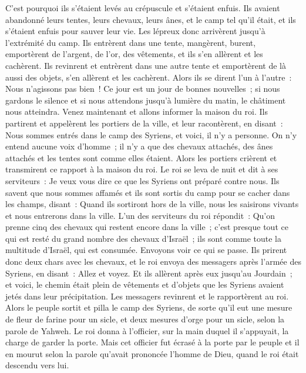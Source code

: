 \begin{multicols}{2}
C'est pourquoi ils s'étaient levés au crépuscule et s'étaient enfuis. Ils avaient abandonné leurs tentes, leurs chevaux, leurs ânes, et le camp tel qu'il était, et ils s'étaient enfuis pour sauver leur vie.
Les lépreux donc arrivèrent jusqu'à l'extrémité du camp. Ils entrèrent dans une tente, mangèrent, burent, emportèrent de l'argent, de l'or, des vêtements, et ils s'en allèrent et les cachèrent. Ils revinrent et entrèrent dans une autre tente et emportèrent de là aussi des objets, s'en allèrent et les cachèrent.
Alors ils se dirent l'un à l'autre~: Nous n'agissons pas bien~! Ce jour est un jour de bonnes nouvelles~; si nous gardons le silence et si nous attendons jusqu'à lumière du matin, le châtiment nous atteindra. Venez maintenant et allons informer la maison du roi.
Ils partirent et appelèrent les portiers de la ville, et leur racontèrent, en disant~: Nous sommes entrés dans le camp des Syriens, et voici, il n'y a personne. On n'y entend aucune voix d'homme~; il n'y a que des chevaux attachés, des ânes attachés et les tentes sont comme elles étaient.
Alors les portiers crièrent et transmirent ce rapport à la maison du roi.
Le roi se leva de nuit et dit à ses serviteurs~: Je veux vous dire ce que les Syriens ont préparé contre nous. Ils savent que nous sommes affamés et ils sont sortis du camp pour se cacher dans les champs, disant~: Quand ils sortiront hors de la ville, nous les saisirons vivants et nous entrerons dans la ville.
L'un des serviteurs du roi répondit~: Qu'on prenne cinq des chevaux qui restent encore dans la ville~; c'est presque tout ce qui est resté du grand nombre des chevaux d'Israël~; ils sont comme toute la multitude d'Israël, qui est consumée. Envoyons voir ce qui se passe.
Ils prirent donc deux chars avec les chevaux, et le roi envoya des messagers après l'armée des Syriens, en disant~: Allez et voyez.
Et ils allèrent après eux jusqu'au Jourdain~; et voici, le chemin était plein de vêtements et d'objets que les Syriens avaient jetés dans leur précipitation. Les messagers revinrent et le rapportèrent au roi.
Alors le peuple sortit et pilla le camp des Syriens, de sorte qu'il eut une mesure de fleur de farine pour un sicle, et deux mesures d'orge pour un sicle, selon la parole de Yahweh.
Le roi donna à l'officier, sur la main duquel il s'appuyait, la charge de garder la porte. Mais cet officier fut écrasé à la porte par le peuple et il en mourut selon la parole qu'avait prononcée l'homme de Dieu, quand le roi était descendu vers lui.

\end{multicols}
